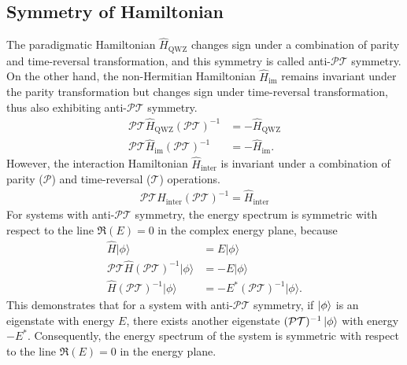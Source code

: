 \documentclass[longbibliography, aps, prx, amsmath, amssymb, amsfonts, twocolumn,superscriptaddress, footinbib]{revtex4-1}
\begin{document}
	\subsection{Symmetry of Hamiltonian~\label{method:symmetry_Hamiltonian}}
	The paradigmatic Hamiltonian $\hat{H}_{\text{QWZ}}$ changes sign under a combination of parity and time-reversal transformation, and this symmetry is called anti-$\mathcal{PT}$ symmetry.
	On the other hand, the non-Hermitian Hamiltonian $\hat{H}_{\text{im}}$ remains invariant under the parity transformation but changes sign under time-reversal transformation, thus also exhibiting anti-$\mathcal{PT}$ symmetry.
	\begin{equation}
		\begin{split}
			\mathcal{PT} \hat{H}_{\text{QWZ}} (\mathcal{PT})^{-1} &= -\hat{H}_{\text{QWZ}} \\
			\mathcal{PT} \hat{H}_{\text{im}} (\mathcal{PT})^{-1} &= -\hat{H}_{\text{im}}.
		\end{split}
	\end{equation}
	However, the interaction Hamiltonian $\hat{H}_{\text{inter}}$ is invariant under a combination of parity ($\mathcal{P}$) and time-reversal ($\mathcal{T}$) operations.
	\begin{equation}
		\begin{split}
			\mathcal{PT} \hat{H}_{\text{inter}} (\mathcal{PT})^{-1} = \hat{H}_{\text{inter}}%
		\end{split}
	\end{equation}
	For systems with anti-$\mathcal{PT}$ symmetry, the energy spectrum is symmetric with respect to the line $\Re(E)=0$ in the complex energy plane, because
	\begin{equation}
		\begin{split}
			\hat{H} \vert \phi \rangle &= E \vert \phi \rangle\\
			\mathcal{PT} \hat{H} (\mathcal{PT})^{-1} \vert \phi \rangle &= - E \vert \phi \rangle\\
			\hat{H} (\mathcal{PT})^{-1} \vert \phi \rangle &= - E^* (\mathcal{PT})^{-1} \vert \phi \rangle.
		\end{split}
	\end{equation}
	This demonstrates that for a system with anti-$\mathcal{PT}$ symmetry, if $\ket{\phi}$ is an eigenstate with energy $E$, there exists another eigenstate $(\mathcal{PT})^{-1} \ket{\phi}$ with energy $-E^*$. Consequently, the energy spectrum of the system is symmetric with respect to the line $\Re(E)=0$ in the energy plane.
\end{document}
